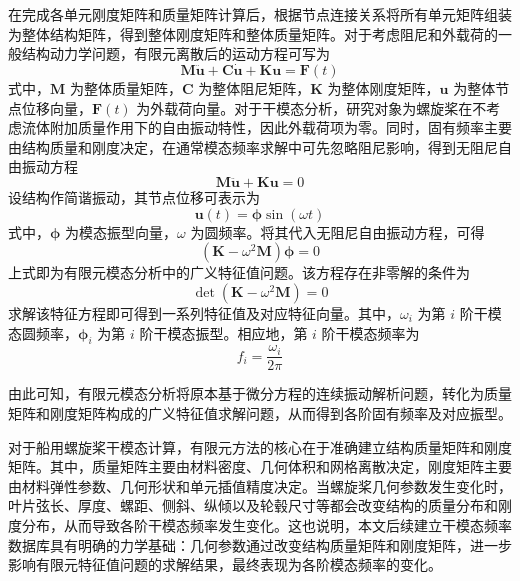 在完成各单元刚度矩阵和质量矩阵计算后，根据节点连接关系将所有单元矩阵组装为整体结构矩阵，得到整体刚度矩阵和整体质量矩阵。对于考虑阻尼和外载荷的一般结构动力学问题，有限元离散后的运动方程可写为
\begin{equation}
  \mathbf{M}\ddot{\mathbf{u}}+\mathbf{C}\dot{\mathbf{u}}+\mathbf{K}\mathbf{u}=\mathbf{F}(t)
\end{equation}
式中，$\mathbf{M}$ 为整体质量矩阵，$\mathbf{C}$ 为整体阻尼矩阵，$\mathbf{K}$ 为整体刚度矩阵，$\mathbf{u}$ 为整体节点位移向量，$\mathbf{F}(t)$ 为外载荷向量。对于干模态分析，研究对象为螺旋桨在不考虑流体附加质量作用下的自由振动特性，因此外载荷项为零。同时，固有频率主要由结构质量和刚度决定，在通常模态频率求解中可先忽略阻尼影响，得到无阻尼自由振动方程
\begin{equation}
  \mathbf{M}\ddot{\mathbf{u}}+\mathbf{K}\mathbf{u}=0
\end{equation}
设结构作简谐振动，其节点位移可表示为
\begin{equation}
  \mathbf{u}(t)=\boldsymbol{\phi}\sin(\omega t)
\end{equation}
式中，$\boldsymbol{\phi}$ 为模态振型向量，$\omega$ 为圆频率。将其代入无阻尼自由振动方程，可得
\begin{equation}
  \left(\mathbf{K}-\omega^2\mathbf{M}\right)\boldsymbol{\phi}=0
\end{equation}
上式即为有限元模态分析中的广义特征值问题。该方程存在非零解的条件为
\begin{equation}
  \det\left(\mathbf{K}-\omega^2\mathbf{M}\right)=0
\end{equation}
求解该特征方程即可得到一系列特征值及对应特征向量。其中，$\omega_i$ 为第 $i$ 阶干模态圆频率，$\boldsymbol{\phi}_i$ 为第 $i$ 阶干模态振型。相应地，第 $i$ 阶干模态频率为
\begin{equation}
  f_i=\frac{\omega_i}{2\pi}
\end{equation}

由此可知，有限元模态分析将原本基于微分方程的连续振动解析问题，转化为质量矩阵和刚度矩阵构成的广义特征值求解问题，从而得到各阶固有频率及对应振型。

对于船用螺旋桨干模态计算，有限元方法的核心在于准确建立结构质量矩阵和刚度矩阵。其中，质量矩阵主要由材料密度、几何体积和网格离散决定，刚度矩阵主要由材料弹性参数、几何形状和单元插值精度决定。当螺旋桨几何参数发生变化时，叶片弦长、厚度、螺距、侧斜、纵倾以及轮毂尺寸等都会改变结构的质量分布和刚度分布，从而导致各阶干模态频率发生变化。这也说明，本文后续建立干模态频率数据库具有明确的力学基础：几何参数通过改变结构质量矩阵和刚度矩阵，进一步影响有限元特征值问题的求解结果，最终表现为各阶模态频率的变化。


